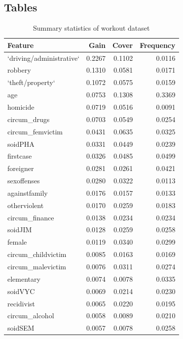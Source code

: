 \documentclass[12pt, twoside,openany]{book} %
\begin{document}
\begin{appendices}
\chapter{Tables}
\begin{table}[ht]
\centering
\begin{tabular}{lrrr}
  \hline
  Feature & Gain & Cover & Frequency \\ 
  \hline
 `driving/administrative` & 0.2267 & 0.1102 & 0.0116 \\ 
   robbery & 0.1310 & 0.0581 & 0.0171 \\ 
   `theft/property` & 0.1072 & 0.0575 & 0.0159 \\ 
   age & 0.0753 & 0.1308 & 0.3369 \\ 
   homicide & 0.0719 & 0.0516 & 0.0091 \\ 
   circum\_drugs & 0.0703 & 0.0549 & 0.0254 \\ 
   circum\_femvictim & 0.0431 & 0.0635 & 0.0325 \\ 
   soidPHA & 0.0331 & 0.0449 & 0.0239 \\ 
   firstcase & 0.0326 & 0.0485 & 0.0499 \\ 
   foreigner & 0.0281 & 0.0261 & 0.0421 \\ 
   sexoffenses & 0.0280 & 0.0322 & 0.0113 \\ 
   againstfamily & 0.0176 & 0.0157 & 0.0133 \\ 
   otherviolent & 0.0170 & 0.0259 & 0.0183 \\ 
   circum\_finance & 0.0138 & 0.0234 & 0.0234 \\ 
   soidJIM & 0.0128 & 0.0259 & 0.0258 \\ 
   female & 0.0119 & 0.0340 & 0.0299 \\ 
   circum\_childvictim & 0.0085 & 0.0163 & 0.0169 \\ 
   circum\_malevictim & 0.0076 & 0.0311 & 0.0274 \\ 
   elementary & 0.0074 & 0.0078 & 0.0335 \\ 
   soidVYC & 0.0069 & 0.0214 & 0.0230 \\ 
   recidivist & 0.0065 & 0.0220 & 0.0195 \\ 
   circum\_alcohol & 0.0058 & 0.0089 & 0.0210 \\ 
   soidSEM & 0.0057 & 0.0078 & 0.0258 \\ 
     \hline
\end{tabular}

 \caption{Summary statistics of workout dataset}
\medskip
{\small {}}
\end{table}







\end{appendices}
\end{document}

